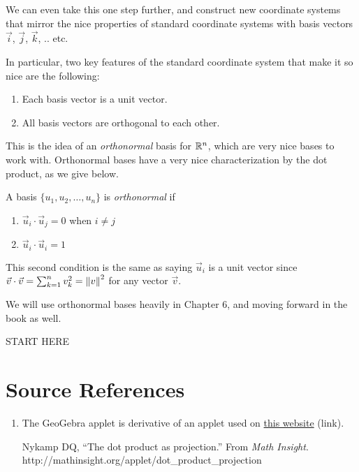 \documentclass{ximera}
\begin{document}
We can even take this one step further, and construct new coordinate systems that mirror the nice properties of standard coordinate systems with basis vectors $\vec{i}$, $\vec{j}$, $\vec{k}$, .. etc. 

In particular, two key features of the standard coordinate system that make it so nice are the following:

\begin{enumerate}
   \item Each basis vector is a unit vector.
   \item All basis vectors are orthogonal to each other.
\end{enumerate}

This is the idea of an \emph{orthonormal} basis for $\mathbb{R}^n$, which are very nice bases to work with. Orthonormal bases have a very nice characterization by the dot product, as we give below.

\begin{definition}
   A basis $\lbrace u_1,u_2,\ldots,u_n\rbrace$ is \emph{orthonormal} if 

   \begin{enumerate}
      \item $\vec{u}_i\cdot\vec{u}_j=0$ when $i\neq j$
      \item $\vec{u}_i\cdot\vec{u}_i=1$
   \end{enumerate}

   This second condition is the same as saying $\vec{u}_i$ is a unit vector since $\vec{v}\cdot\vec{v}=\sum_{k=1}^nv_k^2=\left\|v\right\|^2$ for any vector $\vec{v}$.
\end{definition}

We will use orthonormal bases heavily in Chapter 6, and moving forward in the book as well.


START HERE


\section*{Source References}

\begin{enumerate}
   \item The GeoGebra applet is derivative of an applet used on \href{http://mathinsight.org/applet/dot_product_projection}{this website} (link). 
   
   Nykamp DQ, “The dot product as projection.” From \emph{Math Insight}. http://mathinsight.org/applet/dot\_product\_projection
\end{enumerate}
\end{document}
